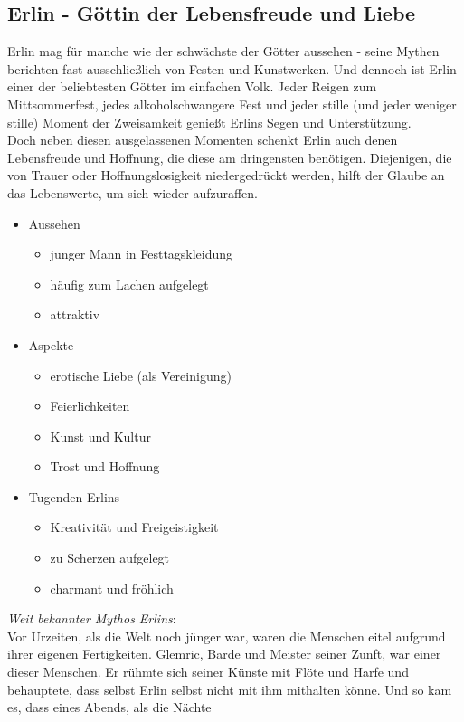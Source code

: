 \subsection{\textbf{Erlin} - Göttin der Lebensfreude und Liebe}
Erlin mag für manche wie der schwächste der Götter aussehen - seine Mythen berichten fast ausschließlich von Festen und Kunstwerken. Und dennoch ist Erlin einer der beliebtesten 
Götter im einfachen Volk. Jeder Reigen zum Mittsommerfest, jedes alkoholschwangere Fest und jeder stille (und jeder weniger stille) Moment der Zweisamkeit genießt Erlins Segen 
und Unterstützung.\\
Doch neben diesen ausgelassenen Momenten schenkt Erlin auch denen Lebensfreude und Hoffnung, die diese am dringensten benötigen. Diejenigen, die von Trauer oder 
Hoffnungslosigkeit niedergedrückt werden, hilft der Glaube an das Lebenswerte, um sich wieder aufzuraffen.
\begin{itemize}
	\item Aussehen 
	\begin{itemize}
		\item junger Mann in Festtagskleidung
		\item häufig zum Lachen aufgelegt
		\item attraktiv 
	\end{itemize}
	\item Aspekte
	\begin{itemize}
		\item erotische Liebe (als Vereinigung)
		\item Feierlichkeiten
		\item Kunst und Kultur
		\item Trost und Hoffnung
	\end{itemize}
	\item Tugenden Erlins
	\begin{itemize}
		\item Kreativität und Freigeistigkeit
		\item zu Scherzen aufgelegt
		\item charmant und fröhlich
	\end{itemize}
\end{itemize}
\textit{Weit bekannter Mythos Erlins}:\\
Vor Urzeiten, als die Welt noch jünger war, waren die Menschen eitel aufgrund ihrer eigenen Fertigkeiten. Glemric, Barde und Meister seiner Zunft, war einer dieser Menschen. 
Er rühmte sich seiner Künste mit Flöte und Harfe und behauptete, dass selbst Erlin selbst nicht mit ihm mithalten könne. Und so kam es, dass eines Abends, als die Nächte 
